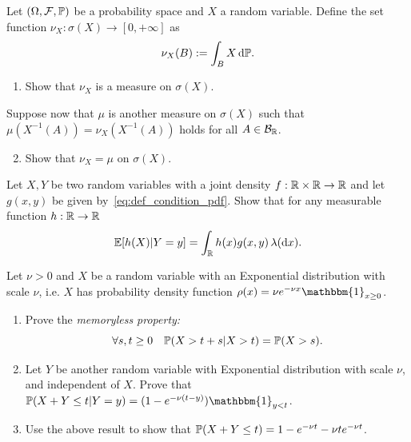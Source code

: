 \begin{problem}\label{prb:uniqueness_integration_measures}
Let $(\Omega, \mathcal F, \mathbb P)$ be a probability space and $X$ a random variable. Define the set function $\nu_X : \sigma(X) \to [0,+\infty]$ as
\[
	\nu_X(B) := \int_B X \, \mathrm{d} \mathbb P.
\]
\begin{enumerate}[label={(\alph*)}]
\item Show that $\nu_X$ is a measure on $\sigma(X)$.
\end{enumerate}

Suppose now that $\mu$ is another measure on $\sigma(X)$ such that $\mu(X^{-1}(A)) = \nu_X(X^{-1}(A))$ holds for all $A \in \mathcal B_{\mathbb R}$.
\begin{enumerate}[label={(\alph*)}]
\setcounter{enumi}{1}
\item Show that $\nu_X = \mu$ on $\sigma(X)$.
\end{enumerate}
\end{problem}

\begin{problem}
Let $X,Y$ be two random variables with a joint density $f : \mathbb R \times \mathbb R \to \mathbb R$ and let $g(x,y)$ be given by~\eqref{eq:def_condition_pdf}. Show that for any measurable function $h : \mathbb R \to \mathbb R$
\[
	\mathbb E[h(X) | Y = y] = \int_{\mathbb R} h(x) g(x,y) \, \lambda(\mathrm{d} x).
\]
\end{problem}

\begin{problem}
Let $\nu > 0$ and $X$ be a random variable with an Exponential distribution with scale $\nu$, i.e. $X$ has probability density function $\rho(x) = \nu e^{-\nu x} \mathbbm{1}_{x \ge 0}$.
\begin{enumerate}[label={(\alph*)}]
\item Prove the \emph{memoryless property:}
\[
	\forall s,t \ge 0 \quad \mathbb P(X > t+s | X > t) = \mathbb P(X > s).
\]
\item Let $Y$ be another random variable with Exponential distribution with scale $\nu$, and independent of $X$. Prove that $\bbP(X + Y \le t | Y = y) = (1 - e^{-\nu (t - y)}) \mathbbm{1}_{y < t}$.
\item Use the above result to show that $\mathbb P(X + Y \le t) = 1 - e^{-\nu t} - \nu t e^{-\nu t}$. 
\end{enumerate}

\end{problem}

